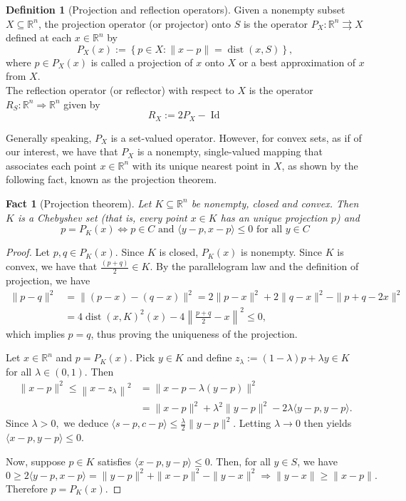 \documentclass[smallextended,numbook,nospthms]{svjour3}
\theoremstyle{plain}
\newtheorem{fact}[theorem]{Fact}
\theoremstyle{definition}
\newtheorem{definition}[theorem]{Definition}
\def\RR{\mathds R}
\DeclareMathOperator{\dist}{dist}
\begin{document}
\begin{definition}[Projection and reflection operators]{\label{def:proj}}
	Given a nonempty subset $X \subseteq \RR^n$, the projection operator (or projector) onto $S$ is the operator $P_{X}: \RR^n \rightrightarrows X$ defined at each $x \in \RR^n$ by
	\[
	P_{X}(x):=\left\{p \in X:\|x-p\|=\dist(x,S)\right\},
	\]
	where $p \in P_{X}(x)$ is called a projection of $x$ onto $X$ or a best approximation of $x$ from $X$.\\
	The reflection operator (or reflector) with respect to $X$ is the operator $R_{S}: \RR^n \Rightarrow \RR^n$ given by
	\[
	R_{X}:=2P_{X}-\operatorname{Id}
	\]
\end{definition}

Generally speaking, $P_{X}$ is a set-valued operator.
However, for convex sets, as if of our interest, we have that $P_{X}$ is a nonempty, single-valued mapping that associates each point $x \in \RR^n$ with its unique nearest point in $X$, as shown by the following fact, known as the projection theorem.

\begin{fact}[Projection theorem]\label{fact:proj thm}
	Let $K \subseteq \RR^{n}$ be nonempty, closed and convex. Then $K$ is a Chebyshev set (that is, every point $x \in K$ has an unique projection $p$) and
	\begin{equation}
		p=P_{K}(x) \iff p \in C \text { and }\langle y-p, x-p\rangle \leq 0 \text { for all } y \in C
	\end{equation}
\end{fact}
\begin{proof}
	Let $p, q \in P_{K}(x)$. Since $K$ is closed, $P_{K}(x)$ is nonempty. Since $K$ is convex, we have that $\frac{(p+q)}{2} \in K$. By the parallelogram law and the definition of projection, we have
	\[
	\begin{aligned}
		\|p-q\|^{2} &=\|(p-x)-(q-x)\|^{2} = 2\|p-x\|^{2}+2\|q-x\|^{2}-\|p+q-2 x\|^{2} \\
		&=4 \dist(x,K)^{2}(x)-4\left\|\frac{p+q}{2}-x\right\|^{2} \leq 0,
	\end{aligned}
	\]
	which implies $p=q$, thus proving the uniqueness of the projection. 
	
	Let $x \in \RR^n$ and $p=P_{K}(x)$. Pick $y \in K$ and define $z_{\lambda}:=(1-\lambda) p+\lambda y \in K$ for all $\lambda \in (0,1)$. Then
	\begin{align}
		\|x-p\|^{2} \leq\left\|x-z_{\lambda}\right\|^{2} &=\|x-p-\lambda(y-p)\|^{2} \\
		&=\|x-p\|^{2}+\lambda^{2}\|y-p\|^{2}-2 \lambda\langle y-p, y-p\rangle.
	\end{align}
	Since $\lambda>0,$ we deduce $\langle s-p, c-p\rangle \leq \frac{\lambda}{2}\|y-p\|^{2}$. Letting $\lambda \rightarrow 0$ then yields $\langle x-p, y-p\rangle \leq 0$.
	
	Now, suppose $p \in K$ satisfies
	$\langle x-p, y-p\rangle \leq 0$. Then, for all $y \in S$, we have
	\[
	0 \geq 2\langle y-p, x-p\rangle=\|y-p\|^{2}+\|x-p\|^{2}-\|y-x\|^{2} \Longrightarrow\|y-x\| \geq\|x-p\|.
	\]
	Therefore $p=P_{K}(x)$.
\end{proof}
\end{document}
